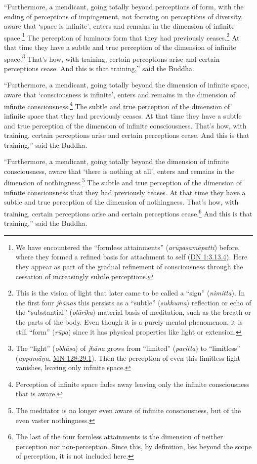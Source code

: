 \documentclass[12pt,openany]{book}%
\begin{document}
“Furthermore, a mendicant, going totally beyond perceptions of form, with the ending of perceptions of impingement, not focusing on perceptions of diversity, aware that ‘space is infinite’, enters and remains in the dimension of infinite space.\footnote{We have encountered the “formless attainments” (\textit{\textsanskrit{arūpasamāpatti}}) before, where they formed a refined basis for attachment to self (\href{https://suttacentral.net/dn1/en/sujato\#3.13.4}{DN 1:3.13.4}). Here they appear as part of the gradual refinement of consciousness through the cessation of increasingly subtle perceptions. } The perception of luminous form that they had previously ceases.\footnote{This is the vision of light that later came to be called a “sign” (\textit{nimitta}). In the first four \textit{\textsanskrit{jhānas}} this persists as a “subtle” (\textit{sukhuma}) reflection or echo of the “substantial” (\textit{\textsanskrit{olārika}}) material basis of meditation, such as the breath or the parts of the body. Even though it is a purely mental phenomenon, it is still “form” (\textit{\textsanskrit{rūpa}}) since it has physical properties like light or extension. } At that time they have a subtle and true perception of the dimension of infinite space.\footnote{The “light” (\textit{\textsanskrit{obhāsa}}) of \textit{\textsanskrit{jhāna}} grows from “limited” (\textit{paritta}) to “limitless” (\textit{\textsanskrit{appamāṇa}}, \href{https://suttacentral.net/mn128/en/sujato\#29.1}{MN 128:29.1}). Then the perception of even this limitless light vanishes, leaving only infinite space. } That’s how, with training, certain perceptions arise and certain perceptions cease. And this is that training,” said the Buddha. 

“Furthermore, a mendicant, going totally beyond the dimension of infinite space, aware that ‘consciousness is infinite’, enters and remains in the dimension of infinite consciousness.\footnote{Perception of infinite space fades away leaving only the infinite consciousness that is aware. } The subtle and true perception of the dimension of infinite space that they had previously ceases. At that time they have a subtle and true perception of the dimension of infinite consciousness. That’s how, with training, certain perceptions arise and certain perceptions cease. And this is that training,” said the Buddha. 

“Furthermore, a mendicant, going totally beyond the dimension of infinite consciousness, aware that ‘there is nothing at all’, enters and remains in the dimension of nothingness.\footnote{The meditator is no longer even aware of infinite consciousness, but of the even vaster nothingness. } The subtle and true perception of the dimension of infinite consciousness that they had previously ceases. At that time they have a subtle and true perception of the dimension of nothingness. That’s how, with training, certain perceptions arise and certain perceptions cease.\footnote{The last of the four formless attainments is the dimension of neither perception nor non-perception. Since this, by definition, lies beyond the scope of perception, it is not included here. } And this is that training,” said the Buddha. 
\end{document}
